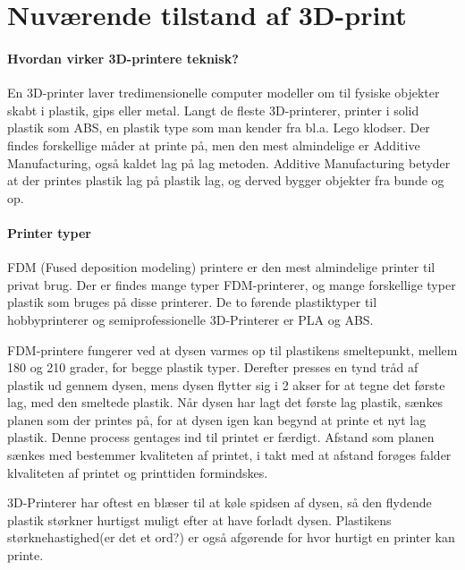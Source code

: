 \chapter{Nuværende tilstand af 3D-print} %
\label{cha:nuv_rende_tilstand_af_3d_print}


\subsubsection{Hvordan virker 3D-printere teknisk?}
			
En 3D-printer laver tredimensionelle computer modeller om til fysiske objekter skabt i plastik, gips eller metal. Langt de fleste 3D-printerer, printer i solid plastik som ABS, en plastik type som man kender fra bl.a. Lego klodser. Der findes forskellige måder at printe på, men den mest almindelige er Additive Manufacturing, også kaldet lag på lag metoden. Additive Manufacturing betyder at der printes plastik lag på plastik lag, og derved bygger objekter fra bunde og op. 

\subsubsection{Printer typer}
FDM (Fused deposition modeling) printere er den mest almindelige printer til privat brug. Der er findes mange typer FDM-printerer, og mange forskellige typer plastik som bruges på disse printerer. De to førende plastiktyper til hobbyprinterer og semiprofessionelle 3D-Printerer er PLA og ABS. 


FDM-printere fungerer ved at dysen varmes op til plastikens smeltepunkt, mellem 180 og 210 grader, for begge plastik typer. Derefter presses en tynd tråd af plastik ud gennem dysen, mens dysen flytter sig i 2 akser for at tegne det første lag, med den smeltede plastik. 
Når dysen har lagt det første lag plastik, sænkes planen som der printes på, for at dysen igen kan begynd at printe et nyt lag plastik. Denne process gentages ind til printet er færdigt. 
Afstand som planen sænkes med bestemmer kvaliteten af printet, i takt med at afstand forøges falder klvaliteten af printet og printtiden formindskes.

3D-Printerer har oftest en blæser til at køle spidsen af dysen, så den flydende plastik størkner hurtigst muligt efter at have forladt dysen. Plastikens størknehastighed(er det et ord?) er også afgørende for hvor hurtigt en printer kan printe. 

